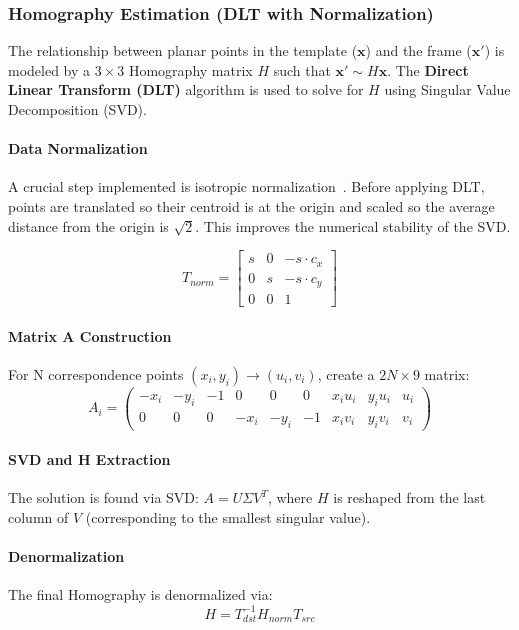 \documentclass[10pt,twocolumn]{extarticle}
\begin{document}
\subsubsection{Homography Estimation (DLT with Normalization)}
The relationship between planar points in the template ($\mathbf{x}$) and the frame ($\mathbf{x}'$) is modeled by a $3 \times 3$ Homography matrix $H$ such that $\mathbf{x}' \sim H\mathbf{x}$. The \textbf{Direct Linear Transform (DLT)} algorithm is used to solve for $H$ using Singular Value Decomposition (SVD).

\paragraph{Data Normalization} A crucial step implemented is isotropic normalization~\cite{hartley2003}. Before applying DLT, points are translated so their centroid is at the origin and scaled so the average distance from the origin is $\sqrt{2}$. This improves the numerical stability of the SVD.

\begin{equation}
    T_{norm} = \begin{bmatrix} s & 0 & -s \cdot c_x \\ 0 & s & -s \cdot c_y \\ 0 & 0 & 1 \end{bmatrix}
\end{equation}

\paragraph{Matrix A Construction} For N correspondence points $(x_i, y_i) \rightarrow (u_i, v_i)$, create a $2N \times 9$ matrix:
   $$A_i = \begin{pmatrix} -x_i & -y_i & -1 & 0 & 0 & 0 & x_i u_i & y_i u_i & u_i \\ 0 & 0 & 0 & -x_i & -y_i & -1 & x_i v_i & y_i v_i & v_i \end{pmatrix}$$

\paragraph{SVD and H Extraction} The solution is found via SVD: $A = U\Sigma V^T$, where $H$ is reshaped from the last column of $V$ (corresponding to the smallest singular value).

\paragraph{Denormalization}
The final Homography is denormalized via: 
\begin{equation}
    H = T_{dst}^{-1} H_{norm} T_{src}
\end{equation}
\end{document}

